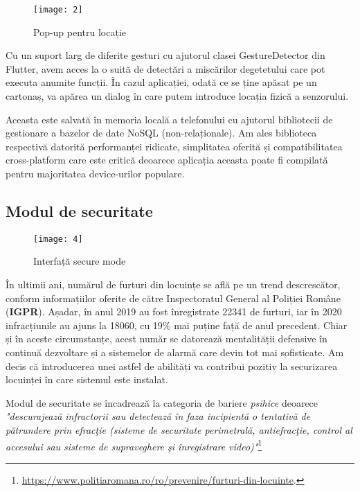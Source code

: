 \begin{wrapfigure}{r}{0.4\textwidth}
	\texttt{[image: 2]}
	\caption{Pop-up pentru locație}
	\label{fig:2}
\end{wrapfigure}

Cu un suport larg de diferite gesturi cu ajutorul clasei GestureDetector din Flutter, avem acces la o suită de detectări a mișcărilor degetetului care pot executa anumite funcții. În cazul aplicației, odată ce se ține apăsat pe un cartonaș, va apărea un dialog în care putem introduce locația fizică a senzorului.

Aceasta este salvată în memoria locală a telefonului cu ajutorul bibliotecii de gestionare a bazelor de date NoSQL (non-relaționale). Am ales biblioteca respectivă datorită performanței ridicate, simplitatea oferită și compatibilitatea cross-platform care este critică deoarece aplicația aceasta poate fi compilată pentru majoritatea device-urilor populare. 
\break

\subsection{Modul de securitate} 

\begin{wrapfigure}{r}{0.4\textwidth}
	\texttt{[image: 4]}
	\caption{Interfață secure mode}
	\label{fig:4}
\end{wrapfigure}

În ultimii ani, numărul de furturi din locuințe se află pe un trend descrescător, conform informațiilor oferite de către Inspectoratul General al Poliției Române (\textbf{IGPR}). Așadar, în anul 2019 au fost înregistrate 22341 de furturi, iar în 2020 infracțiunile au ajuns la 18060, cu 19\% mai puține față de anul precedent. Chiar și în aceste circumstanțe, acest număr se datorează mentalității defensive în continuă dezvoltare și a sistemelor de alarmă care devin tot mai sofisticate. Am decis că introducerea unei astfel de abilități va contribui pozitiv la securizarea locuinței în care sistemul este instalat.

Modul de securitate se încadrează la categoria de bariere \emph{psihice} deoarece \emph{"descurajează infractorii sau detectează în faza incipientă o tentativă de pătrundere prin efracţie (sisteme de securitate perimetrală, antiefracţie, control al accesului sau sisteme de supraveghere şi înregistrare video)"}\footnote{\url{https://www.politiaromana.ro/ro/prevenire/furturi-din-locuinte}.}

